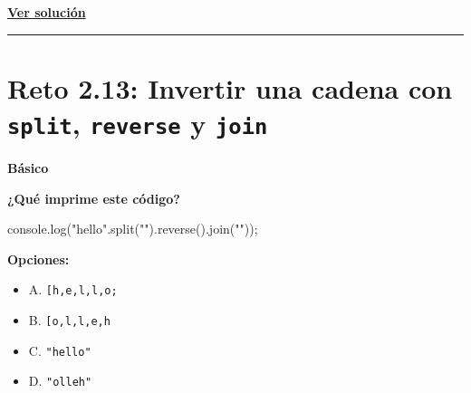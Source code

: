 \documentclass[
  letterpaper,
  DIV=11,
  numbers=noendperiod]{scrreprt}
\newenvironment{Shaded}{\begin{snugshade}}{\end{snugshade}}
\newcommand{\BuiltInTok}[1]{\textcolor[rgb]{0.00,0.23,0.31}{#1}}
\newcommand{\FunctionTok}[1]{\textcolor[rgb]{0.28,0.35,0.67}{#1}}
\newcommand{\NormalTok}[1]{\textcolor[rgb]{0.00,0.23,0.31}{#1}}
\newcommand{\OperatorTok}[1]{\textcolor[rgb]{0.37,0.37,0.37}{#1}}
\newcommand{\StringTok}[1]{\textcolor[rgb]{0.13,0.47,0.30}{#1}}
\providecommand{\tightlist}{%
  \setlength{\itemsep}{0pt}\setlength{\parskip}{0pt}}
\begin{document}
\textbf{\hyperref[sec-sol-cap2-reto12]{Ver solución}}

\begin{center}\rule{0.5\linewidth}{0.5pt}\end{center}

\section{\texorpdfstring{Reto 2.13: Invertir una cadena con
\texttt{split}, \texttt{reverse} y
\texttt{join}}{Reto 2.13: Invertir una cadena con split, reverse y join}}\label{sec-cap2-reto13}

\begin{tcolorbox}[enhanced jigsaw, left=2mm, toprule=.15mm, leftrule=.75mm, breakable, colback=white, coltitle=black, bottomtitle=1mm, arc=.35mm, rightrule=.15mm, colframe=quarto-callout-caution-color-frame, opacitybacktitle=0.6, toptitle=1mm, opacityback=0, titlerule=0mm, title=\textcolor{quarto-callout-caution-color}{\faFire}\hspace{0.5em}{Dificultad}, bottomrule=.15mm, colbacktitle=quarto-callout-caution-color!10!white]

\textbf{Básico}

\end{tcolorbox}

\textbf{¿Qué imprime este código?}

\begin{Shaded}
\begin{Highlighting}[]
\BuiltInTok{console}\OperatorTok{.}\FunctionTok{log}\NormalTok{(}\StringTok{"hello"}\OperatorTok{.}\FunctionTok{split}\NormalTok{(}\StringTok{""}\NormalTok{)}\OperatorTok{.}\FunctionTok{reverse}\NormalTok{()}\OperatorTok{.}\FunctionTok{join}\NormalTok{(}\StringTok{""}\NormalTok{))}\OperatorTok{;} 
\end{Highlighting}
\end{Shaded}

\textbf{Opciones:}

\begin{itemize}
\tightlist
\item
  A.
  \texttt{{[}\textquotesingle{}h\textquotesingle{},\textquotesingle{}e\textquotesingle{},\textquotesingle{}l\textquotesingle{},\textquotesingle{}l\textquotesingle{},\textquotesingle{}o\textquotesingle{}{]};}
\item
  B.
  \texttt{{[}\textquotesingle{}o\textquotesingle{},\textquotesingle{}l\textquotesingle{},\textquotesingle{}l\textquotesingle{},\textquotesingle{}e\textquotesingle{},\textquotesingle{}h\textquotesingle{}{]}}
\item
  C. \texttt{"hello"}
\item
  D. \texttt{"olleh"}
\end{itemize}
\end{document}
